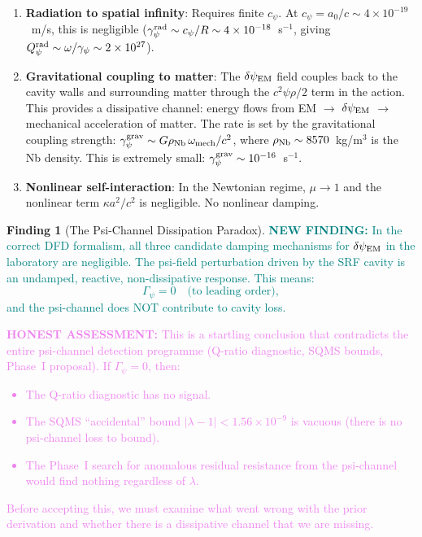 \documentclass[11pt]{article}
\newcommand{\lbone}{|\lambda - 1|}
\newcommand{\Qpsi}{Q_\psi}
\newcommand{\ee}[1]{\times 10^{#1}}
\newcommand{\gpsi}{\gamma_\psi}
\newcommand{\dpsiEM}{\delta\psi_{\rm EM}}
\newcommand{\honest}[1]{\textcolor{violet}{\textbf{HONEST ASSESSMENT:} #1}}
\newcommand{\newfinding}[1]{\textcolor{teal}{\textbf{NEW FINDING:} #1}}
\theoremstyle{definition}
\newtheorem{finding}[theorem]{Finding}
\theoremstyle{remark}
\begin{document}
\begin{enumerate}
\item \textbf{Radiation to spatial infinity}: Requires finite
  $c_\psi$. At $c_\psi = a_0/c \sim 4\ee{-19}$~m/s, this is
  negligible ($\gpsi^{\rm rad} \sim c_\psi/R \sim 4\ee{-18}$~s$^{-1}$,
  giving $\Qpsi^{\rm rad} \sim \omega/\gpsi \sim 2\ee{27}$).

\item \textbf{Gravitational coupling to matter}: The $\dpsiEM$ field
  couples back to the cavity walls and surrounding matter through the
  $c^2 \psi \rho/2$ term in the action. This provides a dissipative
  channel: energy flows from EM $\to$ $\dpsiEM$ $\to$ mechanical
  acceleration of matter. The rate is set by the gravitational coupling
  strength: $\gpsi^{\rm grav} \sim G \rho_{\rm Nb}\,\omega_{\rm mech}
  /c^2$, where $\rho_{\rm Nb} \sim 8570$~kg/m$^3$ is the Nb density.
  This is extremely small: $\gpsi^{\rm grav} \sim 10^{-16}$~s$^{-1}$.

\item \textbf{Nonlinear self-interaction}: In the Newtonian regime,
  $\mu \to 1$ and the nonlinear term $\kappa a^2/c^2$ is negligible.
  No nonlinear damping.
\end{enumerate}

\begin{finding}[The Psi-Channel Dissipation Paradox]
\label{find:paradox}
\newfinding{In the correct DFD formalism, all three candidate
damping mechanisms for $\dpsiEM$ in the laboratory are negligible.
The psi-field perturbation driven by the SRF cavity is an
undamped, reactive, non-dissipative response. This means:
\begin{equation}
\Gamma_\psi = 0 \quad \text{(to leading order)},
\end{equation}
and the psi-channel does NOT contribute to cavity loss.}

\honest{This is a startling conclusion that contradicts the entire
psi-channel detection programme (Q-ratio diagnostic, SQMS bounds,
Phase~I proposal). If $\Gamma_\psi = 0$, then:
\begin{itemize}[nosep]
\item The Q-ratio diagnostic has no signal.
\item The SQMS ``accidental'' bound $\lbone < 1.56\ee{-9}$ is
  vacuous (there is no psi-channel loss to bound).
\item The Phase~I search for anomalous residual resistance from
  the psi-channel would find nothing regardless of $\lambda$.
\end{itemize}

Before accepting this, we must examine what went wrong with the
prior derivation and whether there is a dissipative channel that
we are missing.}
\end{finding}
\end{document}
